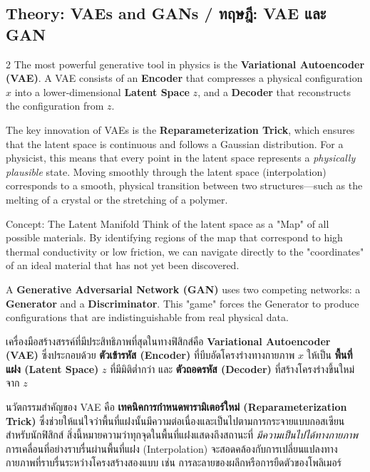 \subsection{Theory: VAEs and GANs \quad / \quad \textthai{ทฤษฎี: VAE และ GAN}}
\begin{paracol}{2}
The most powerful generative tool in physics is the \textbf{Variational Autoencoder (VAE)}. A VAE consists of an \textbf{Encoder} that compresses a physical configuration $x$ into a lower-dimensional \textbf{Latent Space} $z$, and a \textbf{Decoder} that reconstructs the configuration from $z$. 

The key innovation of VAEs is the \textbf{Reparameterization Trick}, which ensures that the latent space is continuous and follows a Gaussian distribution. For a physicist, this means that every point in the latent space represents a \textit{physically plausible} state. Moving smoothly through the latent space (interpolation) corresponds to a smooth, physical transition between two structures—such as the melting of a crystal or the stretching of a polymer.

\begin{aibox}{Concept: The Latent Manifold}
Think of the latent space as a "Map" of all possible materials. By identifying regions of the map that correspond to high thermal conductivity or low friction, we can navigate directly to the "coordinates" of an ideal material that has not yet been discovered.
\end{aibox}

A \textbf{Generative Adversarial Network (GAN)} uses two competing networks: a \textbf{Generator} and a \textbf{Discriminator}. This "game" forces the Generator to produce configurations that are indistinguishable from real physical data.

\switchcolumn

\begin{thai}
เครื่องมือสร้างสรรค์ที่มีประสิทธิภาพที่สุดในทางฟิสิกส์คือ \textbf{Variational Autoencoder (VAE)} ซึ่งประกอบด้วย \textbf{ตัวเข้ารหัส (Encoder)} ที่บีบอัดโครงร่างทางกายภาพ $x$ ให้เป็น \textbf{พื้นที่แฝง (Latent Space)} $z$ ที่มีมิติต่ำกว่า และ \textbf{ตัวถอดรหัส (Decoder)} ที่สร้างโครงร่างขึ้นใหม่จาก $z$

นวัตกรรมสำคัญของ VAE คือ \textbf{เทคนิคการกำหนดพารามิเตอร์ใหม่ (Reparameterization Trick)} ซึ่งช่วยให้แน่ใจว่าพื้นที่แฝงนั้นมีความต่อเนื่องและเป็นไปตามการกระจายแบบกอสเซียน สำหรับนักฟิสิกส์ สิ่งนี้หมายความว่าทุกจุดในพื้นที่แฝงแสดงถึงสถานะที่ \textit{มีความเป็นไปได้ทางกายภาพ} การเคลื่อนที่อย่างราบรื่นผ่านพื้นที่แฝง (Interpolation) จะสอดคล้องกับการเปลี่ยนแปลงทางกายภาพที่ราบรื่นระหว่างโครงสร้างสองแบบ เช่น การละลายของผลึกหรือการยืดตัวของโพลิเมอร์


\end{thai}
\end{paracol}
